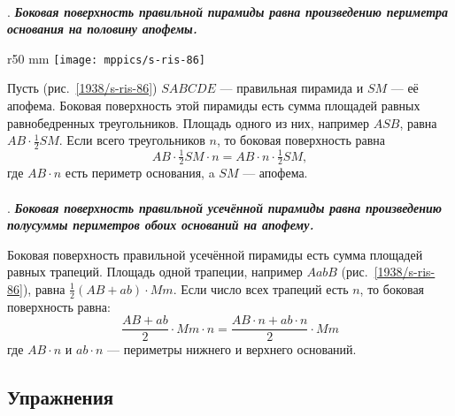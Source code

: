 \paragraph{}\label{1938/s80}
.
\textbf{\emph{Боковая поверхность правильной пирамиды равна произведению периметра основания на половину апофемы.}}

\begin{wrapfigure}{r}{50 mm}
\vskip-0mm
\centering
\texttt{[image: mppics/s-ris-86]}
\caption{}\label{1938/s-ris-86}
\vskip-0mm
\end{wrapfigure}

Пусть (рис.~\ref{1938/s-ris-86}) $SABCDE$ — правильная пирамида и $SM$ — её апофема.
Боковая поверхность этой пирамиды есть сумма площадей равных равнобедренных треугольников.
Площадь одного из них, например $ASB$, равна $AB\cdot\tfrac12SM$.
Если всего треугольников $n$, то боковая поверхность равна 
\[AB\cdot\tfrac12SM\cdot n= AB\cdot n\cdot\tfrac12SM,\]
где $AB\cdot n$ есть периметр основания, a $SM$ — апофема.

\paragraph{}\label{1938/s81}
\mbox{.}
\textbf{\emph{Боковая поверхность правильной усечённой пирамиды равна произведению полусуммы периметров обоих оснований на апофему.}}

Боковая поверхность правильной усечённой пирамиды есть сумма площадей равных трапеций.
Площадь одной трапеции, например $AabB$ (рис.~\ref{1938/s-ris-86}), равна $\tfrac12(AB + ab)\cdot Mm$.
Если число всех трапеций есть $n$, то боковая поверхность равна:
\[\frac{AB+ab}{2}\cdot Mm\cdot n=\frac{AB\cdot n+ab\cdot n}{2}\cdot Mm\]
где $AB\cdot n$ и $ab\cdot n$ — периметры нижнего и верхнего оснований.

\subsection*{Упражнения}



